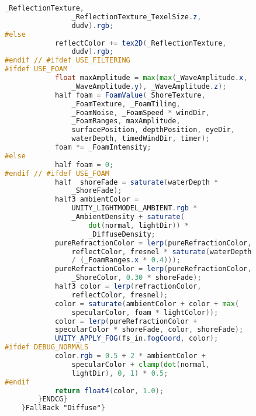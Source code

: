 \begin{lstlisting}[language=GLSL, caption={\label{cf:agua} Shader de efeito de água na Unity}]
				_ReflectionTexture, 
				_ReflectionTexture_TexelSize.z, 
				dudv).rgb;
#else
			reflectColor += tex2D(_ReflectionTexture, 
				dudv).rgb;
#endif // #ifdef USE_FILTERING
#ifdef USE_FOAM
			float maxAmplitude = max(max(_WaveAmplitude.x, 
				_WaveAmplitude.y), _WaveAmplitude.z);
			half foam = FoamValue(_ShoreTexture, 
				_FoamTexture, _FoamTiling,
				_FoamNoise, _FoamSpeed * windDir, 
				_FoamRanges, maxAmplitude,
				surfacePosition, depthPosition, eyeDir, 
				waterDepth, timedWindDir, timer);
			foam *= _FoamIntensity;
#else
			half foam = 0;
#endif // #ifdef USE_FOAM
			half  shoreFade = saturate(waterDepth * 
				_ShoreFade);
			half3 ambientColor = 
				UNITY_LIGHTMODEL_AMBIENT.rgb * 
				_AmbientDensity + saturate(
					dot(normal, lightDir)) * 
					_DiffuseDensity;
			pureRefractionColor = lerp(pureRefractionColor, 
				reflectColor, fresnel * saturate(waterDepth 
				/ (_FoamRanges.x * 0.4)));
			pureRefractionColor = lerp(pureRefractionColor, 
				_ShoreColor, 0.30 * shoreFade);
			half3 color = lerp(refractionColor, 
				reflectColor, fresnel);
			color = saturate(ambientColor + color + max(
				specularColor, foam * lightColor));
			color = lerp(pureRefractionColor + 
			specularColor * shoreFade, color, shoreFade);
			UNITY_APPLY_FOG(fs_in.fogCoord, color);
#ifdef DEBUG_NORMALS
			color.rgb = 0.5 + 2 * ambientColor + 
				specularColor + clamp(dot(normal, 
				lightDir), 0, 1) * 0.5;
#endif
			return float4(color, 1.0);
		}ENDCG}
	}FallBack "Diffuse"}
\end{lstlisting}

\nocite{alin2021}

